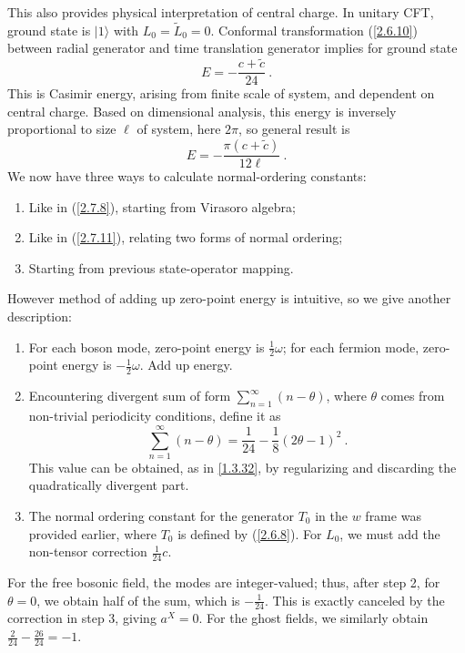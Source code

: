 This also provides physical interpretation of central charge. In unitary CFT, ground state is $|1\rangle$ with $L_{0}=\tilde{L}_{0}=0$.    
Conformal transformation (\ref{2.6.10}) between radial generator and time translation generator implies for ground state    
\begin{equation}
	E=-\frac{c+\tilde{c}}{24} \:.
	\label{2.9.17}
\end{equation}
This is Casimir energy, arising from finite scale of system, and dependent on central charge. Based on dimensional analysis, this energy is inversely proportional to size $\ell$ of system, here $2\pi$, so general result is    
\begin{equation}
	E=-\frac{\pi(c+\tilde{c})}{12 \ell} \:. \label{2.9.18}
\end{equation}
We now have three ways to calculate normal-ordering constants:    
\begin{enumerate}
	\item Like in (\ref{2.7.8}), starting from Virasoro algebra;
	\item Like in (\ref{2.7.11}), relating two forms of normal ordering;
	\item Starting from previous state-operator mapping.    
\end{enumerate}
However method of adding up zero-point energy is intuitive, so we give another description:    
\begin{enumerate}
	\item For each boson mode, zero-point energy is $\frac{1}{2} \omega$; for each fermion mode, zero-point energy is $-\frac{1}{2} \omega$. Add up energy.
	\item Encountering divergent sum of form $\sum_{n=1}^{\infty}(n-\theta)$, where $\theta$ comes from non-trivial periodicity conditions, define it as    
	\begin{equation}
		\sum_{n=1}^{\infty}(n-\theta)=\frac{1}{24}-\frac{1}{8}(2 \theta-1)^{2} \:. \label{2.9.19}
	\end{equation}
	This value can be obtained, as in \eqref{1.3.32}, by regularizing and discarding the quadratically divergent part. 
	\item The normal ordering constant for the generator $T_0$ in the $w$ frame was provided earlier, where $T_0$ is defined by (\ref{2.6.8}). 
	For $L_0$, we must add the non-tensor correction $\frac{1}{24} c$. 
\end{enumerate}
For the free bosonic field, the modes are integer-valued; thus, after step 2, for $\theta=0$, we obtain half of the sum, which is $-\frac{1}{24}$.  This is exactly canceled by the correction in step 3, giving $a^X=0$.  For the ghost fields, we similarly obtain $\frac{2}{24}-\frac{26}{24}=-1$.